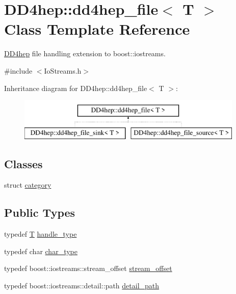 \hypertarget{class_d_d4hep_1_1dd4hep__file}{}\section{D\+D4hep\+:\+:dd4hep\+\_\+file$<$ T $>$ Class Template Reference}
\label{class_d_d4hep_1_1dd4hep__file}


\hyperlink{namespace_d_d4hep}{D\+D4hep} file handling extension to boost\+::iostreams.  




{\ttfamily \#include $<$Io\+Streams.\+h$>$}

Inheritance diagram for D\+D4hep\+:\+:dd4hep\+\_\+file$<$ T $>$\+:\begin{figure}[H]
\begin{center}
\leavevmode
\includegraphics[height=2.000000cm]{class_d_d4hep_1_1dd4hep__file}
\end{center}
\end{figure}
\subsection*{Classes}
\begin{DoxyCompactItemize}
\item 
struct \hyperlink{struct_d_d4hep_1_1dd4hep__file_1_1category}{category}
\end{DoxyCompactItemize}
\subsection*{Public Types}
\begin{DoxyCompactItemize}
\item 
typedef \hyperlink{class_t}{T} \hyperlink{class_d_d4hep_1_1dd4hep__file_a4d79f8d433cd7831ff818691424cd6fc}{handle\+\_\+type}
\item 
typedef char \hyperlink{class_d_d4hep_1_1dd4hep__file_aef4242f7f2fe15a59f7bf7a8f6ba24d5}{char\+\_\+type}
\item 
typedef boost\+::iostreams\+::stream\+\_\+offset \hyperlink{class_d_d4hep_1_1dd4hep__file_a28e1531542193871075e8b7f47818113}{stream\+\_\+offset}
\item 
typedef boost\+::iostreams\+::detail\+::path \hyperlink{class_d_d4hep_1_1dd4hep__file_a1dc19fee9af970892ad53dd7eadc5426}{detail\+\_\+path}
\end{DoxyCompactItemize}
